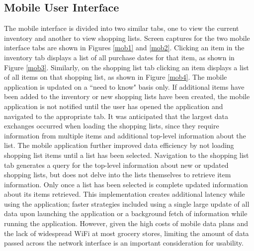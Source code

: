 \documentclass[11pt]{article} %
\begin{document}
\subsection{Mobile User Interface}
The mobile interface is divided into two similar tabs, one to view the current inventory and another to view shopping lists. Screen captures for the two mobile interface tabs are shown in Figures \ref{mob1} and \ref{mob2}. Clicking an item in the inventory tab displays a list of all purchase dates for that item, as shown in Figure \ref{mob3}. Similarly, on the shopping list tab clicking an item displays a list of all items on that shopping list, as shown in Figure \ref{mob4}. The mobile application is  updated on a ``need to know" basis only. If additional items have been added to the inventory or new shopping lists have been created, the mobile application is not notified until the user has opened the application and navigated to the appropriate tab. It was anticipated that the largest data exchanges occurred when loading the shopping lists, since they require information from multiple items and additional top-level information about the list. The mobile application further improved data efficiency by not loading shopping list items until a list has been selected. Navigation to the shopping list tab generates a query for the top-level information about new or updated shopping lists, but does not delve into the lists themselves to retrieve item information. Only once a list has been selected is complete updated information about its items retrieved. This implementation creates additional latency while using the application; faster strategies included using a single large update of all data upon launching the application or a background fetch of information while running the application. However, given the high costs of mobile data plans and the lack of widespread WiFi at most grocery stores, limiting the amount of data passed across the network interface is an important consideration for usability.
\end{document}
